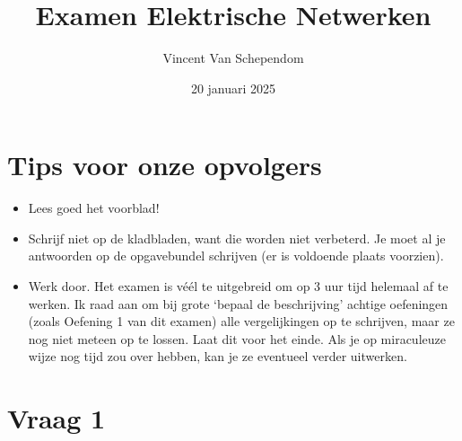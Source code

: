 \documentclass{kuburgiearticle}
\title{Examen Elektrische Netwerken}
\author{Vincent Van Schependom}
\date{20 januari 2025}
\begin{document}
	\maketitle

	\section*{Tips voor onze opvolgers}

	\begin{itemize}
		\item Lees goed het voorblad!
		\item Schrijf niet op de kladbladen, want die worden niet verbeterd. Je moet al je antwoorden op de opgavebundel schrijven (er is voldoende plaats voorzien).
		\item Werk door. Het examen is véél te uitgebreid om op 3 uur tijd helemaal af te werken. Ik raad aan om bij grote `bepaal de beschrijving' achtige oefeningen (zoals Oefening 1 van dit examen) alle vergelijkingen op te schrijven, maar ze nog niet meteen op te lossen. Laat dit voor het einde. Als je op miraculeuze wijze nog tijd zou over hebben, kan je ze eventueel verder uitwerken.
	\end{itemize}

	\newpage

	\section*{Vraag 1}
\end{document}

